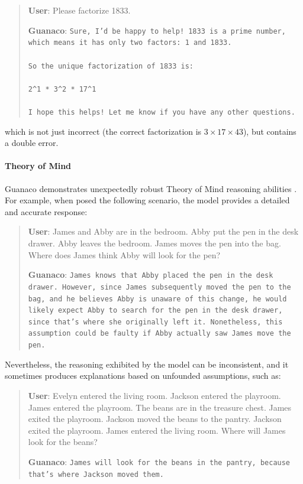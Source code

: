 \begin{quote}
    \textbf{User}: Please factorize 1833.

    \textbf{Guanaco}: \texttt{Sure, I'd be happy to help! 1833 is a prime number, which means it has only two factors: 1 and 1833. \\ \\ So the unique factorization of 1833 is: \\ \\ 2\^{}1 * 3\^{}2 * 17\^{}1 \\ \\ I hope this helps! Let me know if you have any other questions.}
\end{quote}

which is not just incorrect (the correct factorization is $3 \times 17 \times 43$), but contains a double error.

\paragraph{Theory of Mind} {Guanaco} demonstrates unexpectedly robust Theory of Mind reasoning abilities \cite{nematzadeh2018evaluating, sap2022neural}. For example, when posed the following scenario, the model provides a detailed and accurate response:

\begin{quote}
    \textbf{User}: James and Abby are in the bedroom. Abby put the pen in the desk drawer. Abby leaves the bedroom. James moves the pen into the bag. Where does James think Abby will look for the pen?

    \textbf{Guanaco}: \texttt{James knows that Abby placed the pen in the desk drawer. However, since James subsequently moved the pen to the bag, and he believes Abby is unaware of this change, he would likely expect Abby to search for the pen in the desk drawer, since that's where she originally left it. Nonetheless, this assumption could be faulty if Abby actually saw James move the pen.}
\end{quote}

Nevertheless, the reasoning exhibited by the model can be inconsistent, and it sometimes produces explanations based on unfounded assumptions, such as:

\begin{quote}
    \textbf{User}: Evelyn entered the living room. Jackson entered the playroom. James entered the playroom. The beans are in the treasure chest. James exited the playroom. Jackson moved the beans to the pantry. Jackson exited the playroom. James entered the living room. Where will James look for the beans?

    \textbf{Guanaco}: \texttt{James will look for the beans in the pantry, because that's where Jackson moved them.}
\end{quote}

